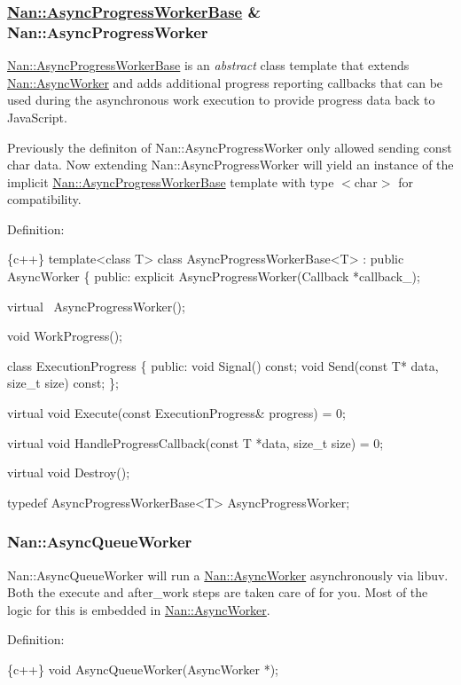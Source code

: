 \label{_api_nan_async_progress_worker}%
 \subsubsection*{\hyperlink{class_nan_1_1_async_progress_worker_base}{Nan\+::\+Async\+Progress\+Worker\+Base} \& Nan\+::\+Async\+Progress\+Worker}

{\ttfamily \hyperlink{class_nan_1_1_async_progress_worker_base}{Nan\+::\+Async\+Progress\+Worker\+Base}} is an {\itshape abstract} class template that extends {\ttfamily \hyperlink{class_nan_1_1_async_worker}{Nan\+::\+Async\+Worker}} and adds additional progress reporting callbacks that can be used during the asynchronous work execution to provide progress data back to Java\+Script.

Previously the definiton of {\ttfamily Nan\+::\+Async\+Progress\+Worker} only allowed sending {\ttfamily const char} data. Now extending {\ttfamily Nan\+::\+Async\+Progress\+Worker} will yield an instance of the implicit {\ttfamily \hyperlink{class_nan_1_1_async_progress_worker_base}{Nan\+::\+Async\+Progress\+Worker\+Base}} template with type {\ttfamily $<$char$>$} for compatibility.

Definition\+:


\begin{DoxyCode}
\{c++\}
template<class T>
class AsyncProgressWorkerBase<T> : public AsyncWorker \{
 public:
  explicit AsyncProgressWorker(Callback *callback\_);

  virtual ~AsyncProgressWorker();

  void WorkProgress();

  class ExecutionProgress \{
   public:
    void Signal() const;
    void Send(const T* data, size\_t size) const;
  \};

  virtual void Execute(const ExecutionProgress& progress) = 0;

  virtual void HandleProgressCallback(const T *data, size\_t size) = 0;

  virtual void Destroy();

typedef AsyncProgressWorkerBase<T> AsyncProgressWorker;
\end{DoxyCode}


\label{_api_nan_async_queue_worker}%
 \subsubsection*{Nan\+::\+Async\+Queue\+Worker}

{\ttfamily Nan\+::\+Async\+Queue\+Worker} will run a {\ttfamily \hyperlink{class_nan_1_1_async_worker}{Nan\+::\+Async\+Worker}} asynchronously via libuv. Both the {\ttfamily execute} and {\ttfamily after\+\_\+work} steps are taken care of for you. Most of the logic for this is embedded in {\ttfamily \hyperlink{class_nan_1_1_async_worker}{Nan\+::\+Async\+Worker}}.

Definition\+:


\begin{DoxyCode}
\{c++\}
void AsyncQueueWorker(AsyncWorker *);
\end{DoxyCode}
 